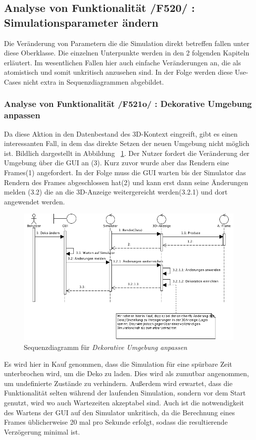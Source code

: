 \subsection{Analyse von Funktionalität /F520/ :  Simulationsparameter ändern}
Die Veränderung von Parametern die die Simulation direkt betreffen fallen unter diese Oberklasse. Die einzelnen Unterpunkte werden in den 2 folgenden Kapiteln erläutert. Im wesentlichen Fallen hier 
auch einfache Veränderungen an, die als atomistisch und somit unkritisch anzusehen sind. In der Folge werden diese Use-Cases nicht extra in Sequenzdiagrammen abgebildet.
\subsubsection{Analyse von Funktionalität /F521o/ :  Dekorative Umgebung anpassen}
Da diese Aktion in den Datenbestand des 3D-Kontext eingreift, gibt es einen interessanten Fall, in dem das direkte Setzen der neuen Umgebung nicht möglich ist. Bildlich dargestellt in Abbildung ~\ref{fig:change_graphic_deko}.
Der Nutzer fordert die Veränderung der Umgebung über die GUI an (3). Kurz zuvor wurde aber das Rendern eine Frames(1) angefordert. 
In der Folge muss die GUI warten bis der Simulator das Rendern des Frames abgeschlossen hat(2) und kann erst dann seine Änderungen melden (3.2) die an die 3D-Anzeige weitergereicht werden(3.2.1) und dort angewendet werden.

\begin{figure}[h!]
\includegraphics[width=\linewidth]{bilder/change_graphic_deko}
\caption{Sequenzdiagramm für \textit{Dekorative Umgebung anpassen}}
\label{fig:change_graphic_deko}
\end{figure}
Es wird hier in Kauf genommen, dass die Simulation für eine spürbare Zeit unterbrochen wird, um die Deko zu laden. Dies wird als zumutbar angenommen, um undefinierte Zustände zu verhindern. 
Außerdem wird erwartet, dass die Funktionalität selten während der laufenden Simulation, sondern vor dem Start genutzt, wird wo auch Wartezeiten akzeptabel sind.
Auch ist die notwendigkeit des Wartens der GUI auf den Simulator unkritisch, da die Berechnung eines Frames üblicherweise 20 mal pro Sekunde erfolgt, sodass die resultierende Verzögerung minimal ist.

